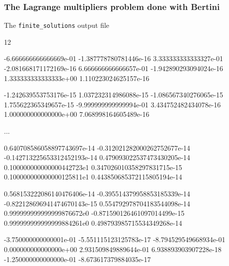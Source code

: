 \documentclass{beamer}
\begin{document}
\begin{frame}[fragile]
\frametitle{The Lagrange multipliers problem done with Bertini}
The {\tt finite\_solutions} output file
\begin{semiverbatim}\tiny
12                                               

-6.666666666666669e-01 -1.387778780781446e-16
3.333333333333327e-01 -2.081668171172169e-16
6.666666666666657e-01 -1.942890293094024e-16
1.333333333333333e+00 1.110223024625157e-16

-1.242639553753176e-15 1.037232314986088e-15
-1.086567340276065e-15 1.755622365349657e-15
-9.999999999999994e-01 3.434752482434078e-16
1.000000000000000e+00 7.068998164605489e-16

...

0.640708586058897743697e-14 -0.312021282000262752677e-14
-0.142713225653312452193e-14 0.479093022537473430205e-14
0.100000000000000442723e1 0.347026010358297831715e-15
0.100000000000000125811e1 0.443850685372115805194e-14

0.568153222086140476406e-14 -0.395514379958853185339e-14
-0.822128696941474670143e-15 0.554792978704183544098e-14
0.999999999999999876672e0 -0.871590126461097014499e-15
0.999999999999999884261e0 0.498793985715534349268e-14

-3.750000000000001e-01 -5.551115123125783e-17
-8.794529549668934e-01 0.000000000000000e+00
2.931509849889644e-01 6.938893903907228e-18
-1.250000000000000e-01 -8.673617379884035e-17

\end{semiverbatim}
\end{frame}
\end{document}
